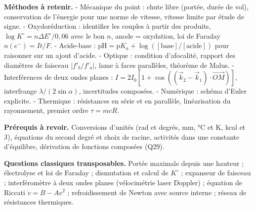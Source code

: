 \documentclass[11pt,a4paper]{article}
\begin{document}
\textbf{Méthodes à retenir.}
- Mécanique du point : chute libre (portée, durée de vol), conservation de l'énergie pour une norme de vitesse, vitesse limite par étude de signe.
- Oxydoréduction : identifier les couples à partir des produits, \(\log K^\circ = n\Delta E^\circ/0{,}06\) avec le bon \(n\), anode = oxydation, loi de Faraday \(n(e^-) = It/F\).
- Acide-base : \(\mathrm{pH} = \mathrm pK_a + \log([\text{base}]/[\text{acide}])\) pour raisonner sur un ajout d'acide.
- Optique : condition d'afocalité, rapport des diamètres de faisceau \(|f'_b/f'_a|\), lame à faces parallèles, théorème de Malus.
- Interférences de deux ondes planes : \(I = 2I_0[1 + \cos((\vec k_2 - \vec k_1)\cdot\overrightarrow{OM})]\), interfrange \(\lambda/(2\sin\alpha)\), incertitudes composées.
- Numérique : schéma d'Euler explicite.
- Thermique : résistances en série et en parallèle, linéarisation du rayonnement, premier ordre \(\tau = mcR\).

\textbf{Prérequis à revoir.} Conversions d'unités (rad et degrés, mm, °C et K, kcal et J), équations du second degré et choix de racine, activités dans une constante d'équilibre, dérivation de fonctions composées (Q29).

\textbf{Questions classiques transposables.} Portée maximale depuis une hauteur ; électrolyse et loi de Faraday ; dismutation et calcul de \(K^\circ\) ; expanseur de faisceau ; interféromètre à deux ondes planes (vélocimétrie laser Doppler) ; équation de Riccati \(\dot v = B - Av^2\) ; refroidissement de Newton avec source interne ; réseau de résistances thermiques.
\end{document}
